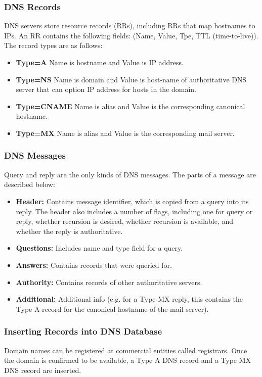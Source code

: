 \documentclass[12pt,titlepage]{article}
\begin{document}
    \subsubsection{DNS Records}
      DNS servers store resource records (RRs), including RRs that map hostnames to IPs. An RR contains the following fields: (Name, Value, Tpe, TTL (time-to-live)).
      The record types are as follows:
      \begin{itemize}
        \item \textbf{Type=A} Name is hostname and Value is IP address.
        \item \textbf{Type=NS} Name is domain and Value is host-name of authoritative DNS server that can option IP address for hosts in the domain.
        \item \textbf{Type=CNAME} Name is alias and Value is the corresponding canonical hostname.
        \item \textbf{Type=MX} Name is alias and Value is the corresponding mail server.
      \end{itemize}

    \subsubsection{DNS Messages}
      Query and reply are the only kinds of DNS messages. The parts of a message are described below:
      \begin{itemize}
        \item \textbf{Header:} Contains message identifier, which is copied from a query into its reply. The header also includes a number of flags, including one for
        query or reply, whether recursion is desired, whether recursion is available, and whether the reply is authoritative.
        \item \textbf{Questions:} Includes name and type field for a query.
        \item \textbf{Answers:} Contains records that were queried for.
        \item \textbf{Authority:} Contains records of other authoritative servers.
        \item \textbf{Additional:} Additional info (e.g. for a Type MX reply, this contains the Type A record for the canonical hostname of the mail server).
      \end{itemize}

    \subsubsection{Inserting Records into DNS Database}
      Domain names can be registered at commercial entities called registrars. Once the domain is confirmed to be available, a Type A DNS record and a Type MX DNS
      record are inserted.
\end{document}
